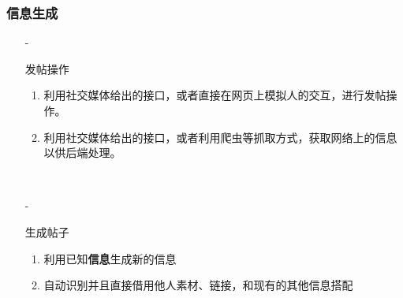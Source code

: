 \documentclass[10pt]{beamer}
\begin{document}
        \begin{frame}
            \frametitle{信息生成}
            \begin{itemize}
                \item[-]{
                    发帖操作
                    \begin{enumerate}
                        \item 利用社交媒体给出的接口，或者直接在网页上模拟人的交互，进行发帖操作。
                        \item 利用社交媒体给出的接口，或者利用爬虫等抓取方式，获取网络上的信息以供后端处理。
                    \end{enumerate}
                    \hspace*{\fill}\\
                    }
                \item[-]{
                    生成帖子
                    \begin{enumerate}
                        \item 利用已知\textbf{信息}生成新的信息
                        \item 自动识别并且直接借用他人素材、链接，和现有的其他信息搭配
                    \end{enumerate}
                    } 
            \end{itemize}
        \end{frame}
\end{document}
